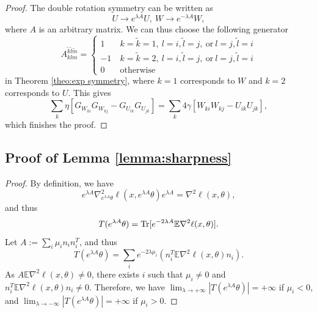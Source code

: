 \documentclass{article}
\theoremstyle{plain}
\newcommand{\E}{\mathbb{E}}
\newcommand{\Tr}{{\rm Tr}}
\begin{document}
\begin{proof}
The double rotation symmetry can be written as
\begin{equation}
U\to e^{\lambda A}U,\ W\to e^{-\lambda A}W,
\end{equation}
where $A$ is an arbitrary matrix. We can thus choose the following generator
\begin{equation}
    A_{klm}^{\tilde{k}\tilde{l}\tilde{m}}=\begin{cases}
1 & \ k=\tilde{k}=1,\ l=i,\tilde{l}=j,\ \text{or}\ l=j,\tilde{l}=i \\
-1& \ k=\tilde{k}=2,\ l=i,\tilde{l}=j,\ \text{or}\ l=j,\tilde{l}=i\\
0&\ \text{otherwise}
\end{cases}
\end{equation} in Theorem \ref{theo:exp symmetry}, where $k=1$ corresponds to $W$ and $k=2$ corresponds to $U$. This gives
\begin{equation}
\sum_k\eta [G_{W_{ki}}G_{W_{kj}}-G_{U_{ik}}G_{U_{jk}}]=\sum_k4\gamma[W_{ki}W_{kj}-U_{ik}U_{jk}],
\end{equation}
which finishes the proof.
\end{proof}

\subsection{Proof of Lemma \ref{lemma:sharpness}}
\begin{proof}
By definition, we have
\begin{equation}
   e^{\lambda A} \nabla_{e^{\lambda A}\theta }^2 \ell (x, e^{\lambda A}\theta ) e^{\lambda A}  = \nabla^2 \ell(x, \theta),
\end{equation}
and thus
\begin{equation}
T(e^{\lambda A}\theta)=\Tr[e^{-2\lambda A}\E\nabla^2\ell(x,\theta)].
\end{equation}
Let $A:=\sum_i\mu_in_in_i^T$, and thus
\begin{equation}
T(e^{\lambda A}\theta)=\sum_{i}e^{-2\lambda\mu_i}(n_i^T\E\nabla^2\ell(x,\theta)n_i).
\end{equation}
As $A\E\nabla^2\ell(x,\theta)\neq0$, there exists $i$ such that $\mu_i\neq0$ and  $n_i^T\E\nabla^2\ell(x,\theta)n_i\neq0$.  Therefore, we have $\lim_{\lambda\to+\infty}|T(e^{\lambda A}\theta)|=+\infty$ if $\mu_i<0$, and $\lim_{\lambda\to-\infty}|T(e^{\lambda A}\theta)|=+\infty$ if $\mu_i>0$.
\end{proof}
\end{document}

